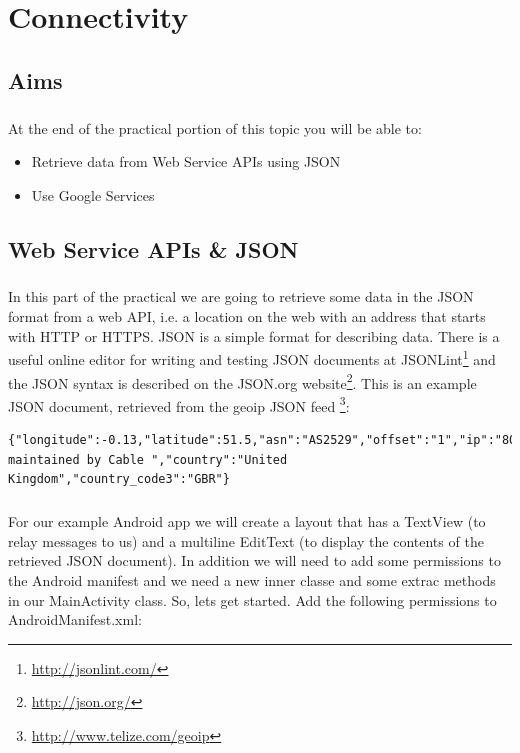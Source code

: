 \chapter{Connectivity}
\section{Aims}
\paragraph{} At the end of the practical portion of this topic you will be able to:

\begin{itemize}
\item Retrieve data from Web Service APIs using JSON
\item Use Google Services
\end{itemize}

\section{Web Service APIs \& JSON}
\paragraph{} In this part of the practical we are going to retrieve some data in the JSON format from a web API, i.e. a location on the web with an address that starts with HTTP or HTTPS. JSON is a simple format for describing data. There is a useful online editor for writing and testing JSON documents at JSONLint\footnote{\url{http://jsonlint.com/}} and the JSON syntax is described on the JSON.org website\footnote{\url{http://json.org/}}. This is an example JSON document, retrieved from the geoip JSON feed \footnote{\url{http://www.telize.com/geoip}}:

\begin{lstlisting}
{"longitude":-0.13,"latitude":51.5,"asn":"AS2529","offset":"1","ip":"80.176.131.121","area_code":"0","continent_code":"EU","dma_code":"0","timezone":"Europe\/London","country_code":"GB","isp":"Now maintained by Cable ","country":"United Kingdom","country_code3":"GBR"}
\end{lstlisting}

\paragraph{} For our example Android app we will create a layout that has a TextView (to relay messages to us) and a multiline EditText (to display the contents of the retrieved JSON document). In addition we will need to add some permissions to the Android manifest and we need a new inner classe and some extrac methods in our MainActivity class. So, lets get started. Add the following permissions to AndroidManifest.xml:

